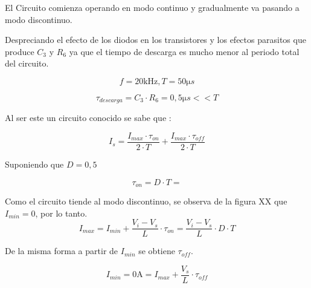 
El Circuito comienza operando en modo continuo y gradualmente va pasando a modo discontinuo.


Despreciando el efecto de los diodos en los transistores y los efectos parasitos que produce $C_3$ y $R_6$ ya que el tiempo de descarga es mucho menor al periodo total del circuito. 


	\begin{equation}
		f = 20 \si{\kilo\Hz} , T = 50 \si{\micro}s 
	\end{equation}


	\begin{equation}
		\si{\tau}_{descarga} = C_3 \cdot R_6 = 0,5 \si{\micro}s << T
	\end{equation}

Al ser este un circuito conocido se sabe que :

\begin{equation}
 	I_s = \frac{{I_{max} \cdot \si{\tau}_{on}}}{{2 \cdot T}} + \frac{{I_{max} \cdot \si{\tau}_{off}}}{{2 \cdot T}}
 	\label{ec:Is}
\end{equation}

 Suponiendo que $D= 0,5$

\begin{equation}
	\si{\tau}_{on} = D \cdot T = 
\end{equation}

Como el circuito tiende al modo discontinuo, se observa de la figura XX que $I_{min} = 0$, por lo tanto.
\begin{equation}
 	I_{max} = I_{min} + \frac{{V_{i} - V_{s}}}{L} \cdot \si{\tau}_{on} = \frac{{V_{i} - V_{s}}}{L} \cdot D \cdot T
\end{equation}

De la misma forma a partir de $I_{min}$ se obtiene $\si{\tau}_{off}$.

\begin{equation}
 	I_{min} = 0 \si{\ampere} =  I_{max} + \frac{V_{s} }{L} \cdot \si{\tau}_{off}  
\end{equation}


